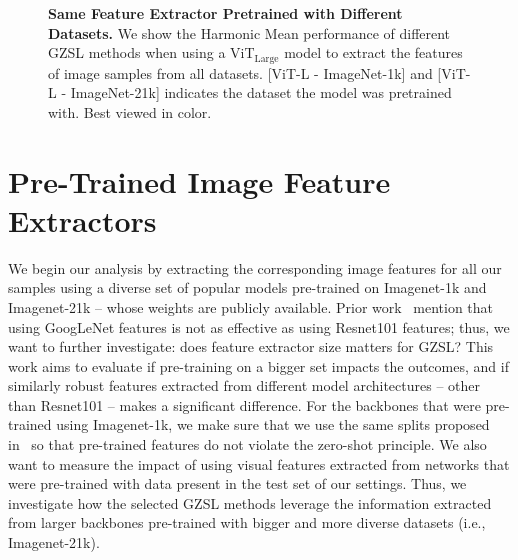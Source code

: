 \begin{figure}[h!]
{\begin{minipage}[t]{0.33\textwidth}
\end{minipage}%
}
 \vspace{-0.05in}
 \caption{\textbf{Same Feature Extractor Pretrained with Different Datasets.} We show the Harmonic Mean performance of different GZSL methods when using a ViT$_{\text{Large}}$ model to extract the features of image samples from all datasets. [ViT-L - ImageNet-1k] and [ViT-L - ImageNet-21k] indicates the dataset the model was pretrained with. Best viewed in color.}
 \label{fig:model_backbone_data_size}
\end{figure}



\section{Pre-Trained Image Feature Extractors}

We begin our analysis by extracting the corresponding image features for all our samples using a diverse set of popular models pre-trained on Imagenet-1k and Imagenet-21k -- whose weights are publicly available. Prior work~\cite{AWA2} mention that using GoogLeNet features is not as effective as using Resnet101 features; thus, we want to further investigate: does feature extractor size matters for GZSL? This work aims to evaluate if pre-training on a bigger set impacts the outcomes, and if similarly robust features extracted from different model architectures -- other than Resnet101 -- makes a significant difference. 
For the backbones that were pre-trained using Imagenet-1k, we make sure that we use the same splits proposed in~\cite{AWA2} so that pre-trained features do not violate the zero-shot principle. 
We also want to measure the impact of using visual features extracted from networks that were pre-trained with data present in the test set of our settings. Thus, we investigate how the selected GZSL methods leverage the information extracted from larger backbones pre-trained with bigger and more diverse datasets (i.e., Imagenet-21k). 



